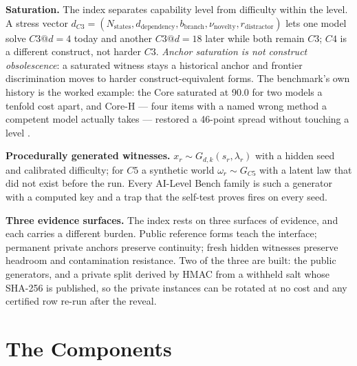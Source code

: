 \documentclass[11pt]{article}
\theoremstyle{definition}
\begin{document}
\textbf{Saturation.} The index separates capability level from difficulty within the level. A stress vector $d_{C3} = (N_{\mathrm{states}}, d_{\mathrm{dependency}}, b_{\mathrm{branch}}, \nu_{\mathrm{novelty}}, r_{\mathrm{distractor}})$ lets one model solve $C3@d{=}4$ today and another $C3@d{=}18$ later while both remain $C3$; $C4$ is a different construct, not harder $C3$. \emph{Anchor saturation is not construct obsolescence}: a saturated witness stays a historical anchor and frontier discrimination moves to harder construct-equivalent forms. The benchmark's own history is the worked example: the Core saturated at 90.0 for two models a tenfold cost apart, and Core-H --- four items with a named wrong method a competent model actually takes --- restored a 46-point spread without touching a level \citep{yang2026hilbenchpaper}.

\textbf{Procedurally generated witnesses.} $x_r \sim G_{d,k}(s_r, \lambda_r)$ with a hidden seed and calibrated difficulty; for $C5$ a synthetic world $\omega_r \sim G_{C5}$ with a latent law that did not exist before the run. Every AI-Level Bench family is such a generator with a computed key and a trap that the self-test proves fires on every seed.

\textbf{Three evidence surfaces.} The index rests on three surfaces of evidence, and each
carries a different burden. Public reference forms teach the interface; permanent private anchors preserve continuity; fresh hidden witnesses preserve headroom and contamination resistance. Two of the three are built: the public generators, and a private split derived by HMAC from a withheld salt whose SHA-256 is published, so the private instances can be rotated at no cost and any certified row re-run after the reveal.

\section{The Components}\label{sec:components}
\end{document}

